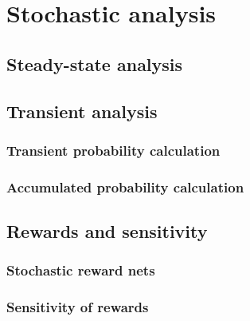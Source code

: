 \chapter{Stochastic analysis}
\label{chap:analysis}

\section{Steady-state analysis}

\section{Transient analysis}

\subsection{Transient probability calculation}

\subsection{Accumulated probability calculation}

\section{Rewards and sensitivity}

\subsection{Stochastic reward nets}

\subsection{Sensitivity of rewards}